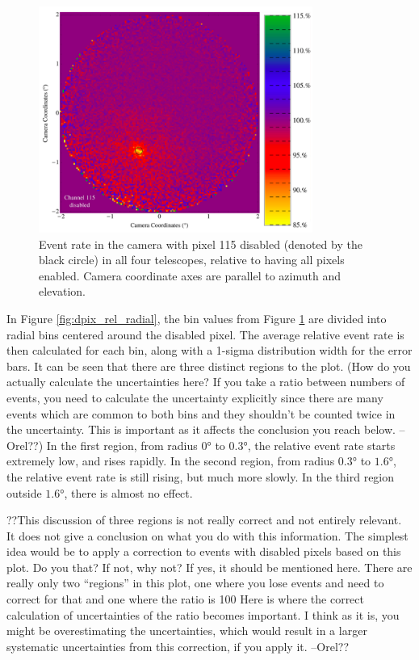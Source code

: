     \begin{figure}[ht]
      \centering
      \includegraphics[width=0.8\textwidth]{images/disabled_pixel/relativerate_camera}
      \caption[Relative Event Rate]{
        Event rate in the camera with pixel 115 disabled (denoted by the black circle) in all four telescopes, relative to having all pixels enabled.
        Camera coordinate axes are parallel to azimuth and elevation.
      }
      \label{fig:dpix_rel_camera}
    \end{figure}

    In Figure \ref{fig:dpix_rel_radial}, the bin values from Figure \ref{fig:dpix_rel_camera} are divided into radial bins centered around the disabled pixel.
    The average relative event rate is then calculated for each bin, along with a 1-sigma distribution width for the error bars.
    It can be seen that there are three distinct regions to the plot.
    (How do you actually calculate the uncertainties here? If you take a ratio between numbers of events, you need to calculate the uncertainty explicitly since there are many events which are common to both bins and they shouldn’t be counted twice in the uncertainty.  This is important as it affects the conclusion you reach below. --Orel??)
    In the first region, from radius $\ang{0}$ to $\ang{0.3}$, the relative event rate starts extremely low, and rises rapidly.
    In the second region, from radius $\ang{0.3}$ to $\ang{1.6}$, the relative event rate is still rising, but much more slowly.
    In the third region outside $\ang{1.6}$, there is almost no effect.

    ??This discussion of three regions is not really correct and not entirely relevant.
    It does not give a conclusion on what you do with this information.
    The simplest idea would be to apply a correction to events with disabled pixels based on this plot. Do you that? If not, why not? If yes, it should be mentioned here.
    There are really only two “regions” in this plot, one where you lose events and need to correct for that and one where the ratio is 100%
    Here is where the correct calculation of uncertainties of the ratio becomes important.
    I think as it is, you might be overestimating the uncertainties, which would result in a larger systematic uncertainties from this correction, if you apply it. --Orel??


